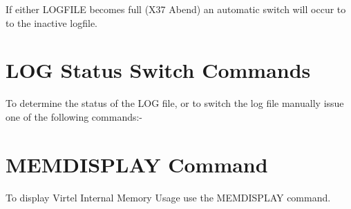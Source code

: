 \documentclass[letterpaper,10pt,english]{sphinxmanual}
\begin{document}
\begin{sphinxVerbatim}[commandchars=\\\{\}]
  
      
\end{sphinxVerbatim}

If either LOGFILE becomes full (X37 Abend) an automatic switch will occur to to the inactive logfile.


\section{LOG Status \textbar{} Switch Commands}
\label{\detokenize{audit_operations_ and_performance:index-10}}\label{\detokenize{audit_operations_ and_performance:log-status-switch-commands}}
To determine the status of the LOG file, or to switch the log file manually issue one of the following commands:-

\begin{sphinxVerbatim}[commandchars=\\\{\}]
                 
                
\end{sphinxVerbatim}

\newpage


\section{MEMDISPLAY Command}
\label{\detokenize{audit_operations_ and_performance:memdisplay-command}}\label{\detokenize{audit_operations_ and_performance:index-11}}
To display Virtel Internal Memory Usage use the MEMDISPLAY command.

\begin{sphinxVerbatim}[commandchars=\\\{\}]
\end{sphinxVerbatim}
\end{document}
